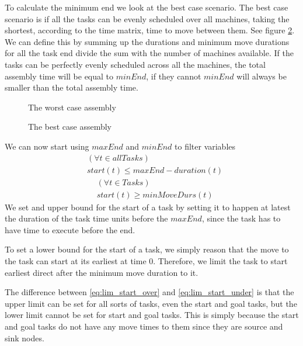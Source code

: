  To calculate the minimum end we look at the best case scenario. The best case scenario is if all the tasks can be evenly scheduled over all machines, taking the shortest, according to the time matrix, time to move between them. See figure \ref{fig:best_case}. We can define this by summing up the durations and minimum move durations for all the task end divide the sum with the number of machines available. If the tasks can be perfectly evenly scheduled across all the machines, the total assembly time will be equal to $minEnd$, if they cannot $minEnd$ will always be smaller than the total assembly time.
 
  \begin{figure}
  	\centering
  	
  	\caption{The worst case assembly}
  	\label{fig:worst_case}
  \end{figure}
   \begin{figure}
   	\centering
   	
   	\caption{The best case assembly}
   	\label{fig:best_case}
   \end{figure}
 \newpage
 We can now start using $maxEnd$ and $minEnd$ to filter variables
  \begin{equation}\label{eq:lim_start_over}
  \begin{aligned}
 &(\forall t \in allTasks)\\
 &start(t) \le maxEnd-duration(t)
  \end{aligned}
  \end{equation}
   \begin{equation}\label{eq:lim_start_under}
  \begin{aligned}
 &(\forall t \in Tasks)\\
 &start(t) \ge minMoveDurs(t)
  \end{aligned}
  \end{equation}
 We set and upper bound for the start of a task by setting it to happen at latest the duration of the task time units before the $maxEnd$, since the task has to have time to execute before the end.
 
 To set a lower bound for the start of a task, we simply reason that the move to the task can start at its earliest at time 0. Therefore, we limit the task to start earliest direct after the minimum move duration to it.
 
 The difference between \ref{eq:lim_start_over} and \ref{eq:lim_start_under} is that the upper limit can be set for all sorts of tasks, even the start and goal tasks, but the lower limit cannot be set for start and goal tasks. This is simply because the start and goal tasks do not have any move times to them since they are source and sink nodes.
 
